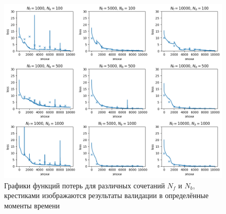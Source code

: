 \documentclass[a4paper,14pt]{extarticle} %
\begin{document}
\begin{figure}[htb!]
    \includegraphics[width=\textwidth]{../plots/termal/loss l = (20x4) Nf=[1000, 5000, 10000] Nu=[100, 500, 1000].png}
    \caption{Графики функций потерь для различных сочетаний $N_f$ и $N_b$, крестиками изображаются результаты валидации в определённые моменты времени}
    \label{fig:termal_loss}
\end{figure}


\end{document}
